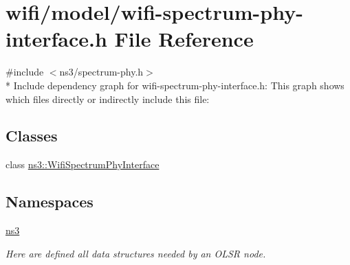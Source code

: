 \hypertarget{wifi-spectrum-phy-interface_8h}{}\section{wifi/model/wifi-\/spectrum-\/phy-\/interface.h File Reference}
\label{wifi-spectrum-phy-interface_8h}
{\ttfamily \#include $<$ns3/spectrum-\/phy.\+h$>$}\\*
Include dependency graph for wifi-\/spectrum-\/phy-\/interface.h\+:
This graph shows which files directly or indirectly include this file\+:
\subsection*{Classes}
\begin{DoxyCompactItemize}
\item 
class \hyperlink{classns3_1_1WifiSpectrumPhyInterface}{ns3\+::\+Wifi\+Spectrum\+Phy\+Interface}
\end{DoxyCompactItemize}
\subsection*{Namespaces}
\begin{DoxyCompactItemize}
\item 
 \hyperlink{namespacens3}{ns3}
\begin{DoxyCompactList}\small\item\em Here are defined all data structures needed by an O\+L\+SR node. \end{DoxyCompactList}\end{DoxyCompactItemize}
